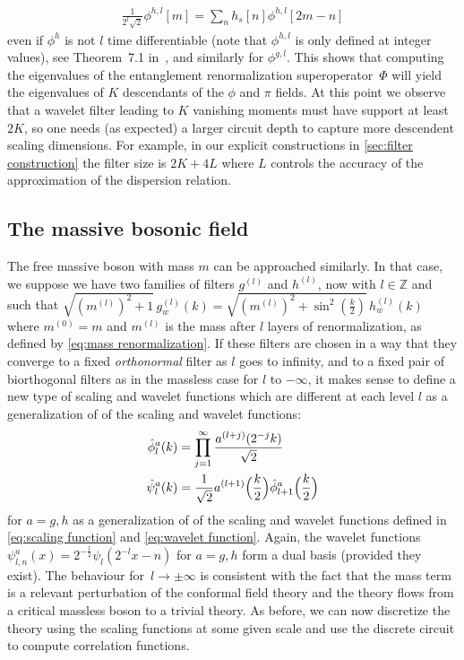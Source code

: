 \documentclass[submission, Phys]{SciPost}
\theoremstyle{definition}
\theoremstyle{remark}
\newcommand{\ZZ}{\mathbb Z}
\begin{document}
\begin{align*}
  \frac{1}{2^l\sqrt2}\phi^{h,l}[m] = \sum_n h_s[n]\phi^{h,l}[2m - n]
\end{align*}
even if $\phi^h$ is not $l$ time differentiable (note that $\phi^{h,l}$ is only defined at integer values), see Theorem~7.1 in~\cite{strang1996wavelets}, and similarly for $\phi^{g,l}$.
This shows that computing the eigenvalues of the entanglement renormalization superoperator~$\Phi$ will yield the eigenvalues of $K$ descendants of the $\phi$ and $\pi$ fields.
At this point we observe that a wavelet filter leading to $K$ vanishing moments must have support at least $2K$, so one needs (as expected) a larger circuit depth to capture more descendent scaling dimensions.
For example, in our explicit constructions in \cref{sec:filter construction} the filter size is $2K + 4L$ where $L$ controls the accuracy of the approximation of the dispersion relation.

\subsection{The massive bosonic field}
The free massive boson with mass $m$ can be approached similarly.
In that case, we suppose we have two families of filters $g^{(l)}$ and $h^{(l)}$, now with $l \in \ZZ$ and such that $\sqrt{(m^{(l)})^2 + 1} \, g^{(l)}_w(k) = \sqrt{(m^{(l)})^2 + \sin^2(\frac{k}{2})} \, h^{(l)}_w(k)$ where $m^{(0)} = m$ and $m^{(l)}$ is the mass after $l$ layers of renormalization, as defined by \cref{eq:mass renormalization}.
If these filters are chosen in a way that they converge to a fixed \emph{orthonormal} filter as $l$ goes to infinity, and to a fixed pair of biorthogonal filters as in the massless case for $l$ to $-\infty$, it makes sense to define a new type of scaling and wavelet functions which are different at each level $l$ as a generalization of of the scaling and wavelet functions:
\begin{equation}\begin{aligned}\label{eq:adaptive scaling functions}
  \hat{\phi}^a_l(k) &= \prod_{j=1}^{\infty} \frac{a^{(l + j)}(2^{-j}k)}{\sqrt2} \\
  \hat{\psi}^a_l(k) &= \frac{1}{\sqrt2} a^{(l+1)}\Bigl(\frac{k}{2}\Bigr)\hat{\phi}^a_{l+1}\Bigl(\frac{k}{2}\Bigr)
\end{aligned}\end{equation}
for $a = g,h$ as a generalization of of the scaling and wavelet functions defined in \cref{eq:scaling function} and \cref{eq:wavelet function}.
Again, the wavelet functions $\psi^a_{l,n}(x) = 2^{-\frac{l}{2}}\psi_l(2^{-l}x - n)$ for $a = g,h$ form a dual basis (provided they exist).
The behaviour for~$l \rightarrow \pm \infty$ is consistent with the fact that the mass term is a relevant perturbation of the conformal field theory and the theory flows from a critical massless boson to a trivial theory.
As before, we can now discretize the theory using the scaling functions at some given scale and use the discrete circuit to compute correlation functions.
\end{document}
